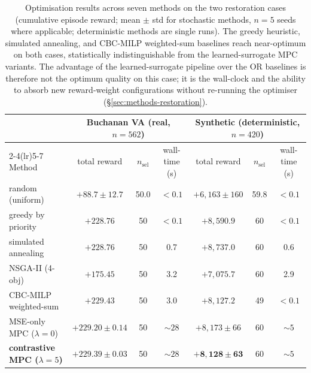 \documentclass[11pt]{article}
\begin{document}
\begin{table}[htbp]
\centering
\small
\caption{Optimisation results across seven methods on the two restoration cases (cumulative episode reward; mean $\pm$ std for stochastic methods, $n=5$ seeds where applicable; deterministic methods are single runs). The greedy heuristic, simulated annealing, and CBC-MILP weighted-sum baselines reach near-optimum on both cases, statistically indistinguishable from the learned-surrogate MPC variants. The advantage of the learned-surrogate pipeline over the OR baselines is therefore not the optimum quality on this case; it is the wall-clock and the ability to absorb new reward-weight configurations without re-running the optimiser (\S\ref{sec:methods-restoration}).}
\label{tab:restoration-baselines}
\begin{tabular}{lccc@{\hspace{1em}}ccc}
\toprule
 & \multicolumn{3}{c}{Buchanan VA (real, $n=562$)} & \multicolumn{3}{c}{Synthetic (deterministic, $n=420$)} \\
\cmidrule(lr){2-4}\cmidrule(lr){5-7}
Method & total reward & $n_{\text{sel}}$ & wall-time (s) & total reward & $n_{\text{sel}}$ & wall-time (s) \\
\midrule
random (uniform) & $+88.7 \pm 12.7$ & 50.0 & $<0.1$ & $+6{,}163 \pm 160$ & 59.8 & $<0.1$ \\
greedy by priority & $+228.76$ & 50 & $<0.1$ & $+8{,}590.9$ & 60 & $<0.1$ \\
simulated annealing & $+228.76$ & 50 & 0.7 & $+8{,}737.0$ & 60 & 0.6 \\
NSGA-II (4-obj) & $+175.45$ & 50 & 3.2 & $+7{,}075.7$ & 60 & 2.9 \\
CBC-MILP weighted-sum & $+229.43$ & 50 & 3.0 & $+8{,}127.2$ & 49 & $<0.1$ \\
MSE-only MPC ($\lambda{=}0$) & $+229.20 \pm 0.14$ & 50 & $\sim 28$ & $+8{,}173 \pm 66$ & 60 & $\sim 5$ \\
\textbf{contrastive MPC ($\lambda{=}5$)} & $\mathbf{+229.39 \pm 0.03}$ & 50 & $\sim 28$ & $\mathbf{+8{,}128 \pm 63}$ & 60 & $\sim 5$ \\
\bottomrule
\end{tabular}
\end{table}
\end{document}
